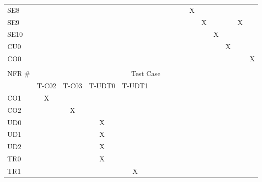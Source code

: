 \documentclass[12pt, titlepage]{article}
\begin{document}
\begin{longtable}{llllllllllllllll}
\multicolumn{1}{l|}{SE8} &  &  &  &  &  &  &  &  & \multicolumn{1}{c}{} & \multicolumn{1}{c}{X} & \multicolumn{1}{c}{} & \multicolumn{1}{c}{} & \multicolumn{1}{c}{} & \multicolumn{1}{c}{} & \multicolumn{1}{c}{} \\
\multicolumn{1}{l|}{SE9} &  &  &  &  &  &  &  &  & \multicolumn{1}{c}{} & \multicolumn{1}{c}{} & \multicolumn{1}{c}{X} & \multicolumn{1}{c}{} & \multicolumn{1}{c}{} & \multicolumn{1}{c}{X} & \multicolumn{1}{c}{} \\
\multicolumn{1}{l|}{SE10} &  &  &  &  &  &  &  &  & \multicolumn{1}{c}{} & \multicolumn{1}{c}{} & \multicolumn{1}{c}{} & \multicolumn{1}{c}{X} & \multicolumn{1}{c}{} & \multicolumn{1}{c}{} & \multicolumn{1}{c}{} \\
\multicolumn{1}{l|}{CU0} &  &  &  &  &  &  &  &  &  &  &  &  & \multicolumn{1}{c}{X} &  &  \\
\multicolumn{1}{l|}{CO0} &  &  &  &  &  &  &  &  &  &  &  &  &  &  & \multicolumn{1}{c}{X} \\
 &  &  &  &  &  &  &  &  &  &  &  &  &  &  &  \\
\multicolumn{1}{l|}{NFR \#} & \multicolumn{15}{c}{Test Case} \\ \hline
\multicolumn{1}{l|}{} & T-C02 & T-C03 & T-UDT0 & T-UDT1 &  &  &  &  &  &  &  &  &  &  &  \\
\multicolumn{1}{l|}{CO1} & \multicolumn{1}{c}{X} & \multicolumn{1}{c}{} & \multicolumn{1}{c}{} &  & \multicolumn{1}{c}{} &  &  &  &  &  &  &  &  &  &  \\
\multicolumn{1}{l|}{CO2} & \multicolumn{1}{c}{} & \multicolumn{1}{c}{X} & \multicolumn{1}{c}{} &  & \multicolumn{1}{c}{} &  &  &  &  &  &  &  &  &  &  \\
\multicolumn{1}{l|}{UD0} & \multicolumn{1}{c}{} & \multicolumn{1}{c}{} & \multicolumn{1}{c}{X} &  & \multicolumn{1}{c}{} &  &  &  &  &  &  &  &  &  &  \\
\multicolumn{1}{l|}{UD1} & \multicolumn{1}{c}{} & \multicolumn{1}{c}{} & \multicolumn{1}{c}{X} &  & \multicolumn{1}{c}{} &  &  &  &  &  &  &  &  &  &  \\
\multicolumn{1}{l|}{UD2} & \multicolumn{1}{c}{} & \multicolumn{1}{c}{} & \multicolumn{1}{c}{X} &  & \multicolumn{1}{c}{} &  &  &  &  &  &  &  &  &  &  \\
\multicolumn{1}{l|}{TR0} & \multicolumn{1}{c}{} & \multicolumn{1}{c}{} & \multicolumn{1}{c}{X} &  & \multicolumn{1}{c}{} &  &  &  &  &  &  &  &  &  &  \\
\multicolumn{1}{l|}{TR1} & \multicolumn{1}{c}{} & \multicolumn{1}{c}{} & \multicolumn{1}{c}{} & \multicolumn{1}{c}{X} & \multicolumn{1}{c}{} & \multicolumn{1}{c}{} &  &  &  &  &  &  &  &  &  \\

\end{longtable}
\end{document}

